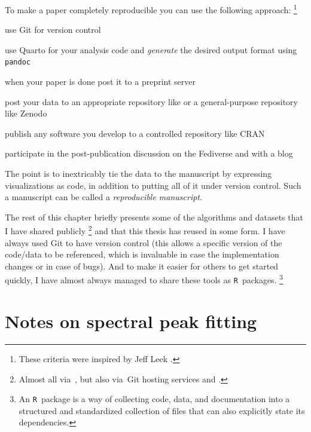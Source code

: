 \documentclass[webedition,openright,titles,swedish,english]{LuaUUThesis}\usepackage[]{graphicx}\usepackage[]{xcolor}
\newcommand{\R}{\texttt{R}}
\newcommand{\via}{via}
\begin{document}
To make a paper completely reproducible you can use the following approach:%
\footnote{These criteria were inspired by Jeff Leek .}
\begin{enumerate*}[label=(\roman*),itemjoin={{, }},itemjoin*={{, and }}]
   \item use Git for version control
   \item use Quarto for your analysis code and \emph{generate} the desired output format using \texttt{pandoc}
   \item when your paper is done post it to a preprint server
   \item post your data to an appropriate repository like 
      or a general-purpose repository like Zenodo
   \item publish any software you develop to a controlled repository like CRAN
   \item participate in the post-publication discussion on the Fediverse and with a blog
\end{enumerate*}
The point is to inextricably tie the data to the manuscript by expressing
visualizations as code, in addition to putting all of it under version control.
Such a manuscript can be called a \emph{reproducible manuscript}.


The rest of this chapter briefly presents some of the algorithms and datasets that
I have shared publicly%
\footnote{
   Almost all \via\ ,
   but also \via\ Git hosting services
    and
   .
}
and that this thesis has reused in some form.
I have always used Git to have version control (this allows a specific version
of the code/data to be referenced, which is invaluable in case the implementation
changes or in case of bugs).
And to make it easier for others to get started quickly, I have almost always
managed to share these tools as \R\ packages.%
\footnote{%
   An \R\ package is a way of collecting code, data, and documentation into
   a structured and standardized collection of files that can also explicitly
   state its dependencies.
}



\section{Notes on spectral peak fitting}
\label{method-development:spectral-peak-fitting}
\end{document}
